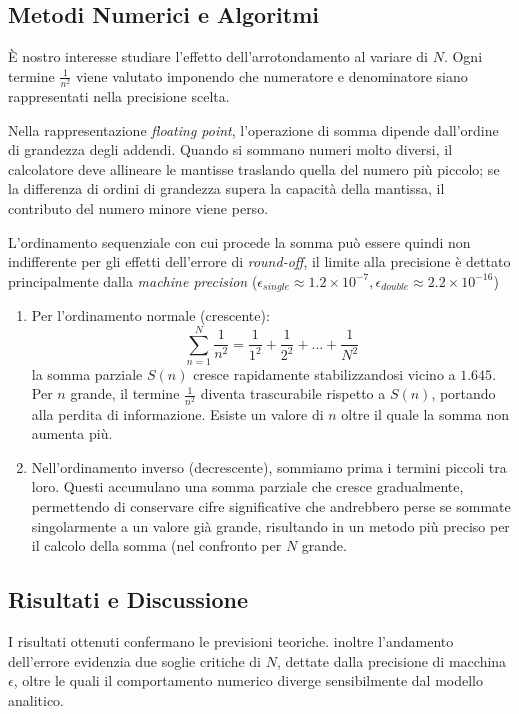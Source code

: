\documentclass[11pt, a4paper]{article}
\begin{document}
\subsection{Metodi Numerici e Algoritmi}
È nostro interesse studiare l'effetto dell'arrotondamento al variare di $N$. Ogni termine $\frac{1}{n^2}$ viene valutato imponendo che numeratore e denominatore siano rappresentati nella precisione scelta.

Nella rappresentazione \textit{floating point}, l'operazione di somma dipende dall'ordine di grandezza degli addendi. Quando si sommano numeri molto diversi, il calcolatore deve allineare le mantisse traslando quella del numero più piccolo; se la differenza di ordini di grandezza supera la capacità della mantissa, il contributo del numero minore viene perso.

\noindent L'ordinamento sequenziale con cui procede la somma può essere quindi non indifferente per gli effetti dell'errore di \textit{round-off}, il limite alla precisione è dettato principalmente dalla \textit{machine precision} ($\epsilon_{single} \approx 1.2 \times 10^{-7}, \epsilon_{double} \approx 2.2 \times 10^{-16}$)
\begin{enumerate}

    \item Per l'ordinamento normale (crescente):
    $$
    \sum_{n=1}^N \frac{1}{n^2} = \frac{1}{1^2} + \frac{1}{2^2} + \dots + \frac{1}{N^2}
    $$
    la somma parziale $S(n)$ cresce rapidamente stabilizzandosi vicino a $1.645$. Per $n$ grande, il termine $\frac{1}{n^2}$ diventa trascurabile rispetto a $S(n)$, portando alla perdita di informazione. Esiste un valore di $n$ oltre il quale la somma non aumenta più.

    \item Nell'ordinamento inverso (decrescente), sommiamo prima i termini piccoli tra loro. Questi accumulano una somma parziale che cresce gradualmente, permettendo di conservare cifre significative che andrebbero perse se sommate singolarmente a un valore già grande, risultando in un metodo più preciso per il calcolo della somma (nel confronto per $N$ grande.
\end{enumerate}

\subsection{Risultati e Discussione}
I risultati ottenuti confermano le previsioni teoriche. inoltre l'andamento dell'errore evidenzia due soglie critiche di $N$, dettate dalla precisione di macchina $\epsilon$, oltre le quali il comportamento numerico diverge sensibilmente dal modello analitico.
\end{document}
